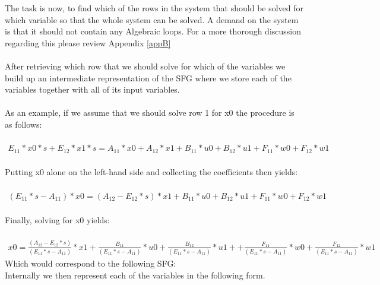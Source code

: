 The task is now, to find which of the rows in the system that should be solved for which variable so that the whole system can be solved. A demand on the system is that it should not contain any Algebraic loops. For a more thorough discussion regarding this please review Appendix \ref{appB}\\\\After retrieving which row that we should solve for which of the variables we build up an intermediate representation of the SFG where we store each of the variables together with all of its input variables.\\\\
As an example, if we assume that we should solve row 1 for x0 the procedure is as follows:\\\\$\begin{array}{rcl} E_{11}*x0*s  +E_{12}*x1*s=A_{11}*x0  +A_{12}*x1 +B_{11}*u0  +B_{12}*u1  +F_{11}*w0  +F_{12}*w1 \end{array}$\\
\\Putting x0 alone on the left-hand side and collecting the coefficients then yields:\\\\$\begin{array}{rcl} (E_{11}*s-A_{11})*x0  =(A_{12}-E_{12}*s)*x1 +B_{11}*u0  +B_{12}*u1 +F_{11}*w0  +F_{12}*w1 \end{array}$\\\\
Finally, solving for x0 yields:\\\\
$\begin{array}{rcl} x0  = \frac{(A_{12}-E_{12}*s)}{(E_{11}*s-A_{11})}*x1 +\frac{B_{11}}{(E_{11}*s-A_{11})}*u0  +\frac{B_{12}}{(E_{11}*s-A_{11})}*u1 ++\frac{F_{11}}{(E_{11}*s-A_{11})}*w0 +\frac{F_{12}}{(E_{11}*s-A_{11})}*w1\end{array}$\\\newline Which would correspond to the following SFG:\\Internally we then represent each of the variables in the following form.\\\newline
%

